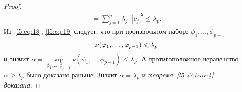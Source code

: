 \documentclass[12pt,a4paper,openany,fleqn]{book}
\theoremstyle{definition}
\begin{document}
\begin{proof}
\begin{multline}
	=\sum\limits_{j=1}^{p}\lambda_j\cdot|c_j|^2\leqslant\lambda_p.
\end{multline}
Из~\eqref{l5:eq:18}, \eqref{l5:eq:19} следует, что при произвольном наборе $\phi_1,\ldots,\phi_{p-1}$
\begin{equation*}
	\hfill\nu(\phi_1,\ldots,\phi_{p-1})\leqslant\lambda_p\hfill
\end{equation*}
и значит $\alpha=\sup\limits_{\phi_1,\ldots,\phi_{p-1}}\nu(\phi_1,\ldots,\phi_{p-1})\leqslant\lambda_p$. А противоположное неравенство $\alpha\geqslant\lambda_p$ было доказано раньше. Значит $\alpha=\lambda_p$ и \emph{теорема~\ref{l5:s2:teor:4} доказана}.
\end{proof}
\end{document}
